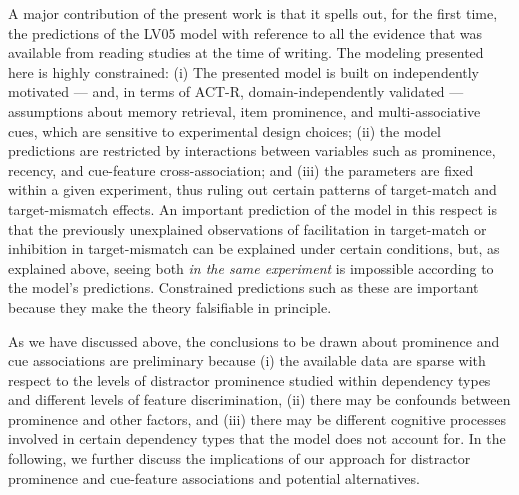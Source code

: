 \documentclass{cambridge7A}\usepackage[]{graphicx}\usepackage[]{color}
\begin{document}
A major contribution of the present work is 
that it spells out, for the first time, 
the predictions of the LV05 model with reference to all the evidence that was available from reading studies at the time of writing. The modeling presented here is highly constrained:
(i) The presented model is built on independently motivated --- and, in terms of ACT-R, domain-independently validated --- assumptions about memory retrieval, item prominence, and multi-associative cues, which are sensitive to experimental design choices; (ii) the model predictions are restricted by interactions between variables such as prominence, recency, and cue-feature cross-association; and (iii) the parameters are fixed within a given experiment, thus ruling out certain patterns of target-match and target-mismatch effects. 
An important prediction of the model in this respect is that the previously unexplained observations of facilitation in target-match or inhibition in target-mismatch can be explained under certain conditions, but,  as explained above, seeing both \textit{in the same experiment} is impossible according to the model's predictions.
Constrained predictions such as these are important because they make the theory falsifiable in principle.

As we have discussed above, the conclusions to be drawn about prominence and cue associations are preliminary because (i) the available data are sparse with respect to the levels of distractor prominence studied within dependency types and different levels of feature discrimination, (ii) there may be confounds between prominence and other factors, and (iii) there may be different cognitive processes involved in certain dependency types that the model does not account for.
In the following, we further discuss the implications of our approach for distractor prominence and cue-feature associations and potential alternatives.
\end{document}

